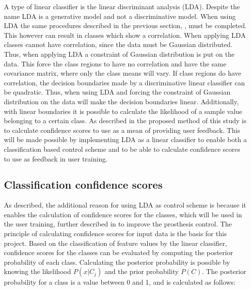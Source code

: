 A type of linear classifier is the linear discriminant analysis (LDA). Despite the name LDA is a generative model and not a discriminative model. \cite{Duda2000} 
When using LDA the same procedures described in the previous section, , must be completed. This however can result in classes which show a correlation. When applying LDA classes cannot have correlation, since the data must be Gaussian distributed. Thus, when applying LDA a constraint of Gaussian distribution is put on the data. This force the class regions to have no correlation and have the same covariance matrix, where only the class means will vary.
If class regions do have correlation, the decision boundaries made by a discriminative linear classifier can be quadratic. Thus, when using LDA and forcing the constraint of Gaussian distribution on the data will make the decision boundaries linear. Additionally, with linear boundaries it is possible to calculate the likelihood of a sample value belonging to a certain class. \cite{Fisher1936, Duda2000}
As described in  the proposed method of this study is to calculate confidence scores to use as a mean of providing user feedback. This will be made possible by implementing LDA as a linear classifier to enable both a classification based control scheme and to be able to calculate confidence scores to use as feedback in user training. 


\subsection{Classification confidence scores} \label{sub:BG:classificationConfidenceScores}
As described, the additional reason for using LDA as control scheme is because it enables the calculation of confidence scores for the classes, which will be used in the user training, further described in  to improve the prosthesis control. The principle of calculating confidence scores for input data is the basis for this project. 
Based on the classification of feature values by the linear classifier, confidence scores for the classes can be evaluated by computing the posterior probability of each class. Calculating the posterior probability is possible by knowing the likelihood $P(x|C_j)$ and the prior probability $P(C)$.
The posterior probability for a class is a value between 0 and 1, and is calculated as follows:

